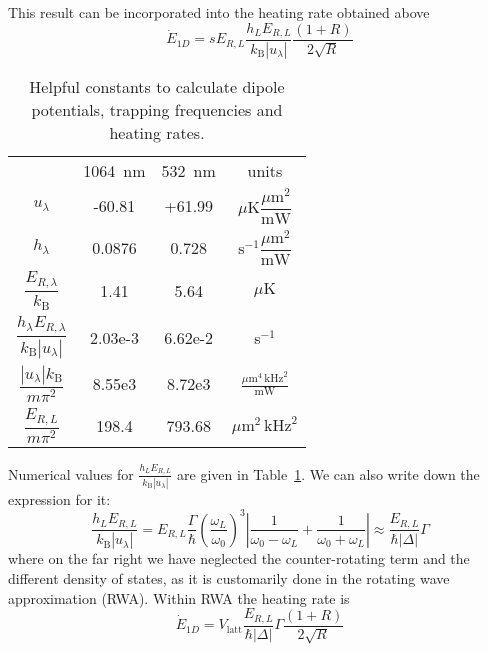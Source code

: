 This result can be incorporated into the heating rate obtained above
\begin{equation}
\boxed{
 \dot{E}_{1D} =  
   s  E_{R,L} 
   \frac{h_{L}  E_{R,L}}{ k_{\text{B}} |u_{\lambda}|} 
   \frac{  ( 1+R) }{2\sqrt{R}}}
\end{equation}
\begin{table}
\begin{center}
\begin{tabular}{c|c|c|c}
      &  1064~nm & 532~nm & units\\ 
    $u_{\lambda}$ &  -60.81 &  +61.99  &  
        $\mu\text{K}\dfrac{  \mu\text{m}^{2} }{\text{mW}}$ \\
    $h_{\lambda}$ & 0.0876 & 0.728 &  
        $ \text{s}^{-1} 
         \dfrac{\mu\text{m}^{2} }{\text{mW}}$ \\
    $ \dfrac{E_{R,\lambda}}{k_{\text{B}}}$ & 1.41 & 5.64 & $\mu\text{K}$ \\
   $ \dfrac{h_{\lambda} E_{R,\lambda}}{ k_{\text{B}} |u_{\lambda}|}$ 
      &    2.03e-3 & 6.62e-2  &  s$^{-1}$  \\
  $\dfrac{ |u_{\lambda}| k_{\text{B}} } { m \pi^{2}}$  &  8.55e3  & 8.72e3  &  
  $\frac{\mu\text{m}^{4}\,\text{kHz}^{2} }{ \text{mW} }$    \\ 
  $\dfrac{ E_{R,L} }{m \pi^{2}}$ & 198.4 & 793.68 & 
  $\mu\text{m}^{2}\, \text{kHz}^{2}$  
\end{tabular}
\end{center}
\caption[Helpful constants for dipole potential, trapping frequencies and
heating rates]{Helpful constants to calculate dipole potentials, trapping
frequencies  and heating rates.}
\label{tab:uLhL} 
\end{table}
Numerical values for  $\frac{h_{L}  E_{R,L}}{ k_{\text{B}} |u_{\lambda}|} $
are given in Table~\ref{tab:uLhL}.  We can also write down the
expression for it:
\begin{equation}
   \frac{h_{L}  E_{R,L}}{ k_{\text{B}} |u_{\lambda}|} = 
  E_{R,L} \frac{ \Gamma }{\hbar} 
   \left( \frac{\omega_{L}}{\omega_{0}} \right)^{3} 
  \left| \frac{1}{\omega_{0} - \omega_{L}} 
   + \frac{1}{\omega_{0} + \omega_{L}} \right| \approx 
  \frac{ E_{R,L}}{\hbar |\Delta|} \Gamma
\end{equation}   
where on the far right we have neglected the counter-rotating term and the
different density of states, as it is customarily done in the rotating wave
approximation (RWA).  Within RWA the heating rate is 
\begin{equation}
 \dot{E}_{1D}  = V_{\text{latt}}    \frac{ E_{R,L}}{\hbar |\Delta|} \Gamma
   \frac{  ( 1+R) }{2\sqrt{R}}
\end{equation}



